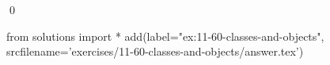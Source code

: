 
\begin{ex}
  \label{ex:11-60-classes-and-objects}
  
  \qed
\end{ex}
\begin{python0}
from solutions import *
add(label="ex:11-60-classes-and-objects",
    srcfilename='exercises/11-60-classes-and-objects/answer.tex')
\end{python0}
